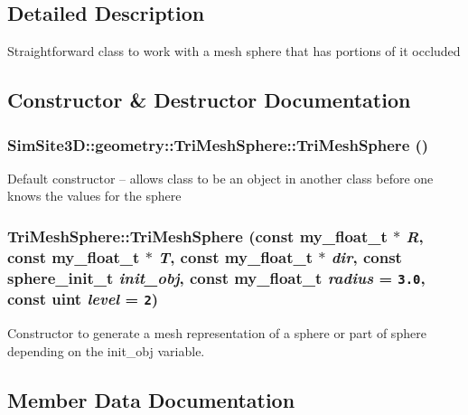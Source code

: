 \subsection{Detailed Description}
Straightforward class to work with a mesh sphere that has portions of it occluded 



\subsection{Constructor \& Destructor Documentation}
\subsubsection{\setlength{\rightskip}{0pt plus 5cm}SimSite3D::geometry::Tri\-Mesh\-Sphere::Tri\-Mesh\-Sphere ()\hspace{0.3cm}{\tt  [inline]}}\label{classSimSite3D_1_1geometry_1_1TriMeshSphere_1e6bc0c8cf5b808ab92acbbf0648ac4c}


Default constructor -- allows class to be an object in another class before one knows the values for the sphere 
\subsubsection{\setlength{\rightskip}{0pt plus 5cm}Tri\-Mesh\-Sphere::Tri\-Mesh\-Sphere (const my\_\-float\_\-t $\ast$ {\em R}, const my\_\-float\_\-t $\ast$ {\em T}, const my\_\-float\_\-t $\ast$ {\em dir}, const \bf{sphere\_\-init\_\-t} {\em init\_\-obj}, const my\_\-float\_\-t {\em radius} = {\tt 3.0}, const uint {\em level} = {\tt 2})}\label{classSimSite3D_1_1geometry_1_1TriMeshSphere_e64b7ebd41fc3709a78a96c0ef36df88}


Constructor to generate a mesh representation of a sphere or part of sphere depending on the init\_\-obj variable. 

\subsection{Member Data Documentation}
